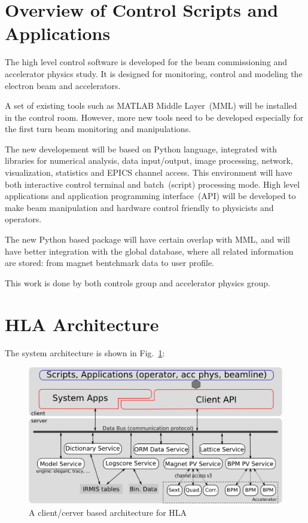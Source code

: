 \documentclass[11pt,oneside,letterpaper,showtrims,article]{memoir}
\begin{document}
\section{Overview of Control Scripts and Applications}

The high level control software is developed for the beam commissioning
and accelerator physics study. It is designed for monitoring, control and modeling
the electron beam and accelerators.

A set of existing tools such as MATLAB Middle Layer~(MML) will be
installed in the control room. However, more new tools need to be
developed especially for the first turn beam monitoring and manipulations.

The new developement will be based on Python language,
integrated with libraries for numerical analysis, data input/output, image
processing, network, visualization, statistics and EPICS channel access. This
environment will have both interactive control terminal and batch~(script)
processing mode. High level applications and application programming
interface~(API) will be developed to make beam manipulation and hardware
control friendly to physicists and operators.

The new Python based package will have certain overlap with MML, and will
have better integration with the global database, where all related
information are stored: from magnet bentchmark data to user profile.

This work is done by both controls group and accelerator physics group.

\section{HLA Architecture}


The system architecture is shown in Fig.~\ref{fig:arch}:

\begin{figure}
  \includegraphics[width=\textwidth]{hla_arch}
  \caption{\label{fig:arch}A client/cerver based architecture for HLA}
\end{figure}
\end{document}
